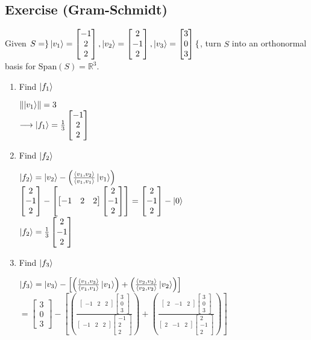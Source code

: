 \documentclass[12pt]{article}
\theoremstyle{plain}
\theoremstyle{nonumberplain}
\theoremstyle{plain}
\theoremstyle{nonumberplain}
\newcommand\1{{\bf 1}}
\newcommand{\bmat}[1]{\begin{bmatrix*} #1 \end{bmatrix*}} %
\newcommand{\R}{\mathbb{R}} %
\newcommand{\<}{\left\langle}
\renewcommand{\>}{\right\rangle}
\newcommand{\lp}{\left(}
\newcommand{\rp}{\right)}
\newcommand{\norm}[1]{\left\lVert#1\right\rVert} %
\newcommand{\inp}[2]{\left\langle#1, #2\right\rangle} %
\newcommand{\spn}[1]{\text{Span}\lp #1\rp} %
\begin{document}
\subsection{Exercise (Gram-Schmidt)}
Given $S=\rbrace\ket{v_1}=\bmat{-1 \\ 2 \\ 2}, \ket{v_2}=\bmat{2 \\ -1 \\ 2}, \ket{v_3}=\bmat{3 \\ 0 \\ 3}\lbrace$, turn $S$ into an orthonormal basis for $\spn{S}=\R^3$.
\begin{enumerate}
\item Find $\ket{f_1}$
\begin{center}
$\norm{\ket{v_1}}=3$ \\
$\longrightarrow\ket{f_1}=\frac{1}{3}\bmat{-1 \\ 2 \\ 2}$ \\
\end{center}
\item Find $\ket{f_2}$
\begin{center}
$\ket{f_2}=\ket{v_2}-\left(\frac{\inp{v_1}{v_2}}{\inp{v_1}{v_1}}\ket{v_1}\right)$ \\
$\bmat{2 \\ -1 \\ 2}-\left[ \bmat{-1 & 2 & 2} \bmat{2 \\ -1 \\ 2} \right] =\bmat{2 \\ -1 \\ 2}-\ket{0}$ \\
$\ket{f_2}=\frac{1}{3}\bmat{2 \\ -1 \\ 2}$
\end{center}
\item Find $\ket{f_3}$
\begin{center}
$\ket{f_3}=\ket{v_3}-\left[ \left( \frac{\inp{v_1}{v_3}}{\inp{v_1}{v_1}}\ket{v_1} \right) + \left( \frac{\inp{v_2}{v_3}}{\inp{v_2}{v_2}}\ket{v_2} \right)  \right]$ \\
$=\bmat{3 \\ 0 \\ 3}-\left[ \left( \frac{\bmat{-1 & 2 & 2}\bmat{3 \\ 0 \\ 3}}{\bmat{-1 & 2 & 2}\bmat{-1 \\ 2 \\ 2}} \right) + \left( \frac{\bmat{2 & -1 & 2}\bmat{3 \\ 0 \\ 3}}{\bmat{2 & -1 & 2}\bmat{2 \\ -1 \\ 2}} \right) \right]$ \\

\end{center}
\end{enumerate}
\end{document}
